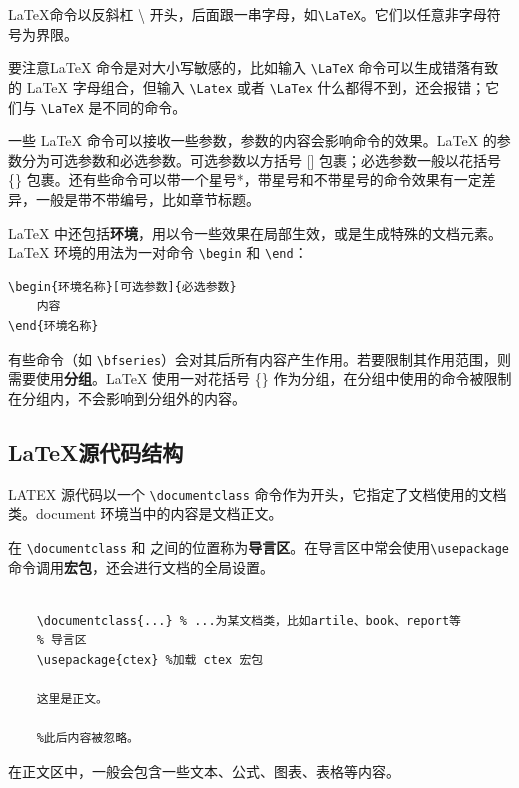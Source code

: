 \LaTeX{}命令以反斜杠 \hspace{0.2em}\textbackslash\hspace{0.2em} 开头，后面跟一串字母，如\lstinline{\LaTeX}。它们以任意非字母符号为界限。

要注意\LaTeX{} 命令是对大小写敏感的，比如输入 \lstinline{\LaTeX} 命令可以生成错落有致的 \LaTeX{} 字母组合，但输入 \lstinline{\Latex} 或者 \lstinline{\LaTex} 什么都得不到，还会报错；它们与 \lstinline{\LaTeX} 是不同的命令。

一些 \LaTeX{} 命令可以接收一些参数，参数的内容会影响命令的效果。\LaTeX{} 的参数分为可选参数和必选参数。可选参数以方括号 [] 包裹；必选参数一般以花括号 \{\} 包裹。还有些命令可以带一个星号*，带星号和不带星号的命令效果有一定差异，一般是带不带编号，比如章节标题。

\LaTeX{} 中还包括{\bf 环境}，用以令一些效果在局部生效，或是生成特殊的文档元素。\LaTeX{} 环境的用法为一对命令 \lstinline{\begin} 和 \lstinline{\end}：
\begin{lstlisting}
\begin{环境名称}[可选参数]{必选参数}
    内容
\end{环境名称}
\end{lstlisting}

有些命令（如 \lstinline{\bfseries}）会对其后所有内容产生作用。若要限制其作用范围，则需要使用{\bf 分组}。\LaTeX{} 使用一对花括号
\{\} 作为分组，在分组中使用的命令被限制在分组内，不会影响到分组外的内容。

\subsection{\LaTeX{}源代码结构}\label{subsec:latexsourcestructure}
LATEX 源代码以一个 \lstinline{\documentclass} 命令作为开头，它指定了文档使用的文档类。document 环境当中的内容是文档正文。

在 \lstinline{\documentclass} 和 \lstinline||之间的位置称为{\bf 导言区}。在导言区中常会使用\lstinline{\usepackage} 命令调用{\bf 宏包}，还会进行文档的全局设置。

\begin{lstlisting}

    \documentclass{...} % ...为某文档类，比如artile、book、report等
    % 导言区 
    \usepackage{ctex} %加载 ctex 宏包
    
    这里是正文。
    
    %此后内容被忽略。

\end{lstlisting}

在正文区中，一般会包含一些文本、公式、图表、表格等内容。

